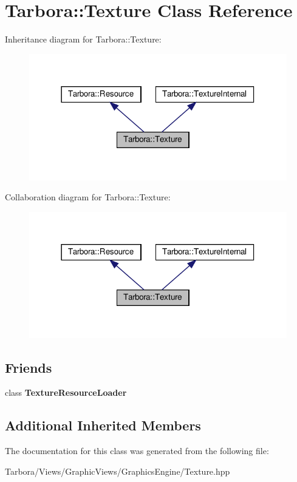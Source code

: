\hypertarget{classTarbora_1_1Texture}{}\section{Tarbora\+:\+:Texture Class Reference}
\label{classTarbora_1_1Texture}


Inheritance diagram for Tarbora\+:\+:Texture\+:\nopagebreak
\begin{figure}[H]
\begin{center}
\leavevmode
\includegraphics[width=318pt]{classTarbora_1_1Texture__inherit__graph}
\end{center}
\end{figure}


Collaboration diagram for Tarbora\+:\+:Texture\+:\nopagebreak
\begin{figure}[H]
\begin{center}
\leavevmode
\includegraphics[width=318pt]{classTarbora_1_1Texture__coll__graph}
\end{center}
\end{figure}
\subsection*{Friends}
\begin{DoxyCompactItemize}
\item 
\mbox{\label{classTarbora_1_1Texture_a2894731fd152f0c4cbf3185a7212b8b7}} 
class {\bfseries Texture\+Resource\+Loader}
\end{DoxyCompactItemize}
\subsection*{Additional Inherited Members}


The documentation for this class was generated from the following file\+:\begin{DoxyCompactItemize}
\item 
Tarbora/\+Views/\+Graphic\+Views/\+Graphics\+Engine/Texture.\+hpp\end{DoxyCompactItemize}
